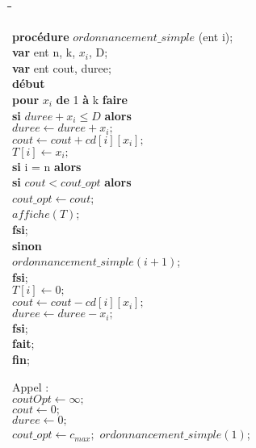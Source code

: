 \documentclass[a4paper, titlepage]{article}
\begin{document}
			\begin{tabbing}

			\hspace{1cm}\=\hspace{1cm}\=\hspace{1cm}\=\hspace{1cm}\=\hspace{1cm}\=\kill %

			\textbf{procédure} $ordonnancement\_simple$ (ent i); \\
			\textbf{var} ent n, k, $x_{i}$, D; \\
			\textbf{var} ent cout, duree; \\
			\textbf{début} \\
			\> \textbf{pour} $x_{i}$ \textbf{de} 1 \textbf{à} k \textbf{faire} \\
			\>\> \textbf{si} $duree+x_{i}\le D$ \textbf{alors} \\
			\>\>\> $duree \leftarrow duree + x_{i};$ \\
			\>\>\> $cout \leftarrow cout + cd[i][x_{i}];$ \\
			\>\>\> $T[i] \leftarrow x_{i};$ \\

			\>\>\> \textbf{si} i = n \textbf{alors} \\
			\>\>\>\> \textbf{si} $cout < cout\_opt$ \textbf{alors} \\
			\>\>\>\>\> $cout\_opt \leftarrow cout$; \\
			\>\>\>\>\> $affiche(T)$; \\
			\>\>\>\> \textbf{fsi}; \\

			\>\>\> \textbf{sinon} \\
			\>\>\>\> $ordonnancement\_simple(i+1)$; \\
			\>\>\> \textbf{fsi}; \\

			\>\>\> $T[i] \leftarrow 0;$ \\
			\>\>\> $cout \leftarrow cout - cd[i][x_{i}];$ \\
			\>\>\> $duree \leftarrow duree - x_{i};	$ \\
			\>\> \textbf{fsi}; \\
			\> \textbf{fait}; \\
			\textbf{fin};

			\end{tabbing}

			\noindent
			Appel :\\
			$coutOpt \leftarrow \infty;$ \\
			$cout \leftarrow 0;$ \\
			$duree \leftarrow 0;$ \\
			$cout\_opt \leftarrow c_{max};$ $ordonnancement\_simple(1)$;
\end{document}

